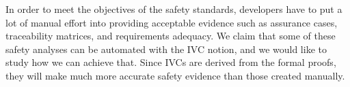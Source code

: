 In order to meet the objectives of the safety standards, developers have to put a lot of manual effort into providing acceptable evidence such as assurance cases, traceability matrices, and requirements adequacy. We claim that some of these safety analyses can be automated with the IVC notion, and we would like to study how we can achieve that. Since IVCs are derived from the formal proofs, they will make much more accurate safety evidence than those created manually.

